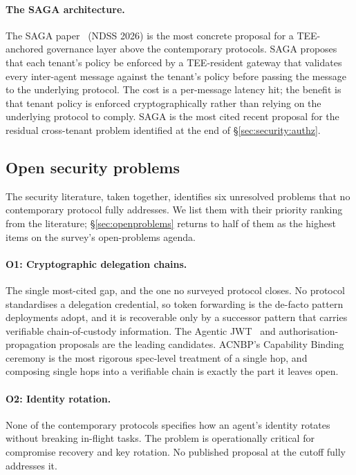 \paragraph{The SAGA architecture.}
The SAGA paper~\cite{saga2026} (NDSS 2026) is the most
concrete proposal for a TEE-anchored governance layer
above the contemporary protocols. SAGA proposes that
each tenant's policy be enforced by a TEE-resident
gateway that validates every inter-agent message against
the tenant's policy before passing the message to the
underlying protocol. The cost is a per-message latency
hit; the benefit is that tenant policy is enforced
cryptographically rather than relying on the
underlying protocol to comply. SAGA is the most cited
recent proposal for the residual cross-tenant problem
identified at the end of \S\ref{sec:security:authz}.

\subsection{Open security problems}
\label{sec:security:open}

The security literature, taken together, identifies six
unresolved problems that no contemporary protocol fully
addresses. We list them with their priority ranking from
the literature; \S\ref{sec:openproblems} returns to half
of them as the highest items on the survey's
open-problems agenda.

\paragraph{O1: Cryptographic delegation chains.}
The single most-cited gap, and the one no surveyed
protocol closes. No protocol standardises a delegation
credential, so token forwarding is the de-facto pattern
deployments adopt, and it is recoverable only by a
successor pattern that carries verifiable
chain-of-custody information. The Agentic
JWT~\cite{agentic_jwt} and authorisation-propagation
\cite{authz_propagation} proposals are the leading
candidates. ACNBP's Capability Binding ceremony
\cite{spec_acnbp} is the most rigorous spec-level
treatment of a single hop, and composing single hops into
a verifiable chain is exactly the part it leaves open.

\paragraph{O2: Identity rotation.}
None of the contemporary protocols specifies how an
agent's identity rotates without breaking
in-flight tasks. The problem is operationally critical
for compromise recovery and key rotation. No published
proposal at the cutoff fully addresses it.

